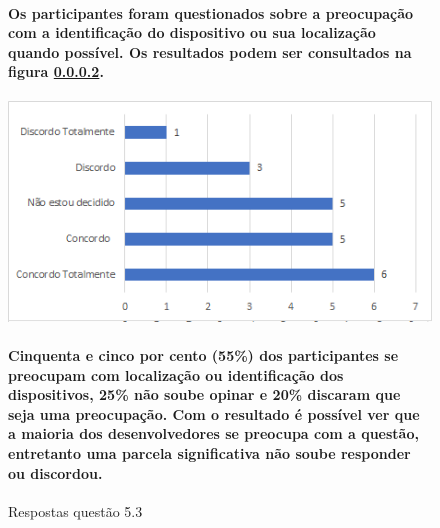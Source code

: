\begin{figure}[!t]
\centering
\paragraph{Os participantes foram questionados sobre a preocupação com a identificação do dispositivo ou sua localização quando possível. Os resultados podem ser consultados na figura \ref{fig:5.3}.}
\includegraphics[scale=0.7]{figuras das questoes/5.3.png}
\caption{Respostas questão 5.3}
\paragraph{Cinquenta e cinco por cento (55{\%}) dos participantes se preocupam com localização ou identificação dos dispositivos, 25{\%} não soube opinar e 20{\%} discaram que seja uma preocupação. Com o resultado é possível ver que a maioria dos desenvolvedores se preocupa com a questão, entretanto uma parcela significativa não soube responder ou discordou.}
\label{fig:5.3}
\end{figure}


